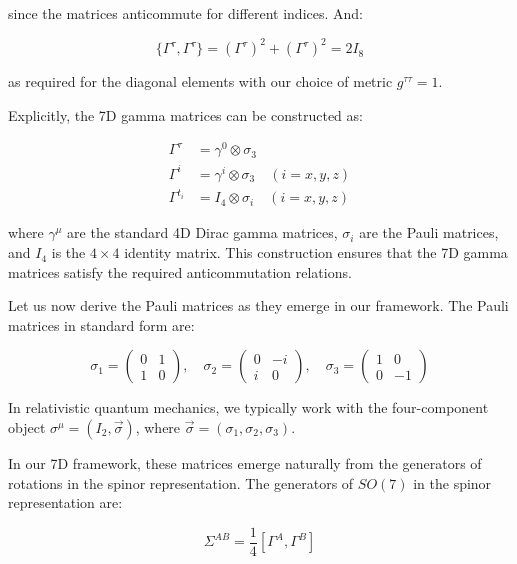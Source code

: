 \documentclass{article}
\begin{document}
since the matrices anticommute for different indices. And:

\begin{equation}
\{\Gamma^\tau, \Gamma^\tau\} = (\Gamma^\tau)^2 + (\Gamma^\tau)^2 = 2I_8
\end{equation}

as required for the diagonal elements with our choice of metric $g^{\tau\tau} = 1$.

Explicitly, the 7D gamma matrices can be constructed as:

\begin{align}
\Gamma^\tau &= \gamma^0 \otimes \sigma_3 \\
\Gamma^i &= \gamma^i \otimes \sigma_3 \quad (i = x, y, z) \\
\Gamma^{t_i} &= I_4 \otimes \sigma_i \quad (i = x, y, z)
\end{align}

where $\gamma^\mu$ are the standard 4D Dirac gamma matrices, $\sigma_i$ are the Pauli matrices, and $I_4$ is the $4 \times 4$ identity matrix. This construction ensures that the 7D gamma matrices satisfy the required anticommutation relations.

Let us now derive the Pauli matrices as they emerge in our framework. The Pauli matrices in standard form are:

\begin{equation}
\sigma_1 = \begin{pmatrix} 0 & 1 \\ 1 & 0 \end{pmatrix}, \quad
\sigma_2 = \begin{pmatrix} 0 & -i \\ i & 0 \end{pmatrix}, \quad
\sigma_3 = \begin{pmatrix} 1 & 0 \\ 0 & -1 \end{pmatrix}
\end{equation}

In relativistic quantum mechanics, we typically work with the four-component object $\sigma^{\mu} = (I_2, \vec{\sigma})$, where $\vec{\sigma} = (\sigma_1, \sigma_2, \sigma_3)$. 

In our 7D framework, these matrices emerge naturally from the generators of rotations in the spinor representation. The generators of $SO(7)$ in the spinor representation are:

\begin{equation}
\Sigma^{AB} = \frac{1}{4}[\Gamma^A, \Gamma^B]
\end{equation}
\end{document}
